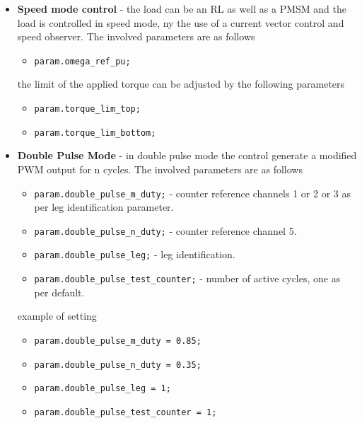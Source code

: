 \documentclass[11pt,a4paper,oneside]{book}
\numberwithin{equation}{section}
\theoremstyle{it}
\theoremstyle{definition}
\begin{document}
\begin{itemize}
	\item[--] \textbf{Speed mode control} - the load can be an RL as well as a PMSM and the load is controlled in speed mode, ny the use of a current vector control and speed observer. The involved parameters are as follows
	\begin{itemize}
		\item[--] \texttt{param.omega\_ref\_pu;}     
	\end{itemize} 
	the limit of the applied torque can be adjusted by the following parameters
	\begin{itemize}
		\item[--] \texttt{param.torque\_lim\_top;}
		\item[--] \texttt{param.torque\_lim\_bottom;}
	\end{itemize}   
	\item[--] \textbf{Double Pulse Mode} - in double pulse mode the control generate a modified PWM output for n cycles. The involved parameters are as follows
	\begin{itemize}
		\item[--] \texttt{param.double\_pulse\_m\_duty;} - counter reference channels 1 or 2 or 3 as per leg identification parameter.   	
		\item[--] \texttt{param.double\_pulse\_n\_duty;} - counter reference channel 5.
		\item[--] \texttt{param.double\_pulse\_leg;} - leg identification.
		\item[--] \texttt{param.double\_pulse\_test\_counter;} - number of active cycles, one as per default.
	\end{itemize} 
	example of setting
	\begin{itemize}
		\item[--] \texttt{param.double\_pulse\_m\_duty = 0.85;}   	
		\item[--] \texttt{param.double\_pulse\_n\_duty = 0.35;}
		\item[--] \texttt{param.double\_pulse\_leg = 1;}
		\item[--] \texttt{param.double\_pulse\_test\_counter = 1;}
	\end{itemize}  
\end{itemize} 
\end{document}
